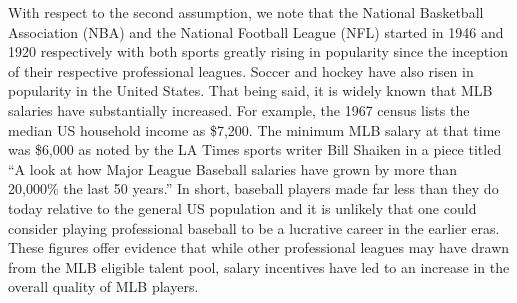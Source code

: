 \documentclass[11pt]{article}\usepackage[]{graphicx}\usepackage[]{color}
\begin{document}
With respect to the second assumption, we note that the 
National Basketball Association (NBA) and the National Football League (NFL) 
started in 1946 and 1920 respectively %
with both sports greatly rising in popularity since the inception of their 
respective professional leagues.  Soccer and hockey have also risen in 
popularity in the United States.  That being said, it is widely known that 
MLB salaries have substantially increased.
For example, the 1967 census lists the median US household income as \$7,200. 
The minimum MLB salary at that time was \$6,000 as noted by the LA Times 
sports writer Bill Shaiken in a piece titled ``A look at how Major League 
Baseball salaries have grown by more than 20,000\% the last 50 years.''
In short,
baseball players made far less than they do today relative to the general US 
population and it is unlikely that one could consider playing professional 
baseball to be a lucrative career in the earlier eras. 
These figures offer evidence that while other 
professional leagues may have drawn from the MLB eligible talent pool, 
salary incentives have led to an increase in the overall quality of MLB 
players.  %
\end{document}
